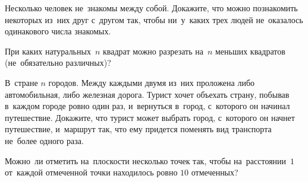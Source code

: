\begin{problems}

\item
Несколько человек не~знакомы между собой.
Докажите, что можно познакомить некоторых из~них друг с~другом так, чтобы
ни~у~каких трех людей не~оказалось одинакового числа знакомых.

\item
При каких натуральных~$n$ квадрат можно разрезать на~$n$ меньших квадратов
(не~обязательно различных)?





\item
В~стране $n$ городов.
Между каждыми двумя из~них проложена либо автомобильная, либо железная дорога.
Турист хочет объехать страну, побывав в~каждом городе ровно один раз,
и~вернуться в~город, с~которого он начинал путешествие.
Докажите, что турист может выбрать город, с~которого он начнет путешествие,
и~маршрут так, что ему придется поменять вид транспорта не~более одного раза.

\item
Можно~ли отметить на~плоскости несколько точек так, чтобы на~расстоянии~$1$
от~каждой отмеченной точки находилось ровно $10$ отмеченных?

\end{problems}

